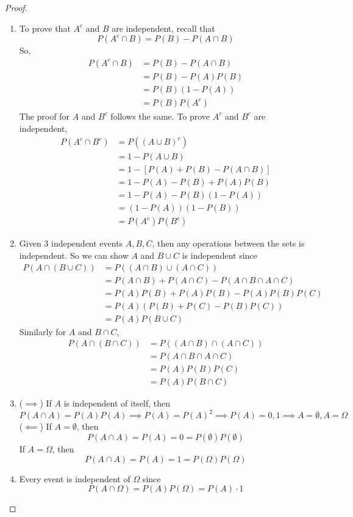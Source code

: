 \documentclass[openany]{report}
\begin{document}
\begin{proof}
    \begin{enumerate}
        \item To prove that $A^c$ and $B$ are independent, recall that
        \[P(A^c \cap B) = P(B) - P(A \cap B)\]
        So, 
        \begin{align*}
            P(A^c \cap B) &= P(B) - P(A \cap B)\\
            &= P(B) - P(A)P(B)\\
            &= P(B)(1 - P(A))\\
            &=P(B)P(A^c)
        \end{align*}
        The proof for $A$ and $B^c$ follows the same. To prove $A^c$ and $B^c$ are independent, 
        \begin{align*}
            P(A^c \cap B^c) &= P((A\cup B)^c)\\
            &= 1 - P(A\cup B)\\
            &= 1 - [P(A) + P(B) - P(A\cap B)]\\
            &= 1 - P(A) - P(B) + P(A)P(B)\\
            &= 1 - P(A) - P(B)(1 - P(A))\\
            &= (1-P(A))(1-P(B))\\
            &= P(A^c)P(B^c)
        \end{align*}
        \item Given 3 independent events $A,B,C$, then any operations between the sets is independent. So we can show $A$ and $B \cup C$ is independent since 
        \begin{align*}
            P(A \cap (B \cup C)) &= P((A \cap B) \cup (A \cap C)) \\
            &= P(A \cap B) + P(A \cap C) - P(A \cap B \cap A \cap C)\\
            &= P(A)P(B) + P(A)P(B) - P(A)P(B)P(C)\\
            &= P(A)(P(B) + P(C) - P(B)P(C))\\
            &= P(A)P(B \cup C)
        \end{align*}
        Similarly for $A$ and $B \cap C$, 
        \begin{align*}
            P(A \cap (B \cap C)) &= P((A \cap B) \cap (A \cap C)) \\
            &= P(A \cap B \cap A \cap C)\\
            &= P(A)P(B)P(C)\\
            &= P(A)P(B \cap C)
        \end{align*}
        \item ($\implies$) If $A$ is independent of itself, then 
        \[P(A \cap A) = P(A)P(A) \implies P(A) = P(A)^2 \implies P(A) =0, 1 \implies A = \emptyset, A = \Omega\]
        ($\impliedby$) If $A = \emptyset$, then 
        \[P(A \cap A) = P(A) = 0 = P(\emptyset)P(\emptyset)\]
        If $A = \Omega$, then
        \[P(A \cap A) = P(A) = 1 = P(\Omega)P(\Omega)\]
        \item Every event is independent of $\Omega$ since
        \[P(A \cap \Omega) = P(A)P(\Omega) = P(A) \cdot 1\]
    \end{enumerate}
    
\end{proof}
\end{document}
